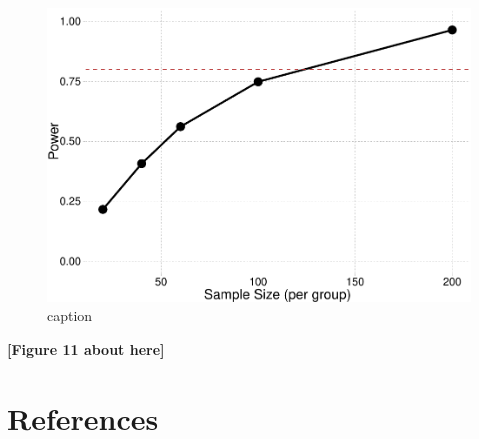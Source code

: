 \documentclass[
  man,floatsintext]{apa6}
\begin{document}
\normalsize

\scriptsize

\begin{figure}

{\centering \includegraphics{paper-new_files/figure-latex/fig-power-curve-1} 

}

\caption{caption}\label{fig:fig-power-curve}
\end{figure}

\begin{center}\textbf{[Figure 11 about here]} \end{center}

\normalsize

\newpage

\section{References}\label{references}
\end{document}
